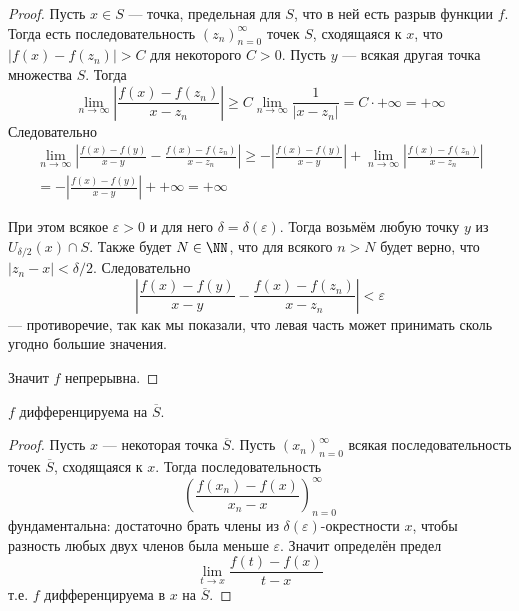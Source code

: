 \documentclass[12pt,a4paper]{article}
\begin{document}
\begin{enumproblem}
        \begin{proof}
            Пусть $x \in S$ --- точка, предельная для $S$, что в ней есть разрыв функции $f$. Тогда есть последовательность $(z_n)_{n=0}^\infty$ точек $S$, сходящаяся к $x$, что $|f(x) - f(z_n)| > C$ для некоторого $C > 0$. Пусть $y$ --- всякая другая точка множества $S$. Тогда
            \[
                \lim_{n \to \infty} \left|\frac{f(x)-f(z_n)}{x-z_n}\right|
                \geqslant C \lim_{n \to \infty} \frac{1}{|x-z_n|}
                = C \cdot +\infty
                = +\infty
            \]
            Следовательно
            \begin{multline*}
                \lim_{n \to \infty} \left|\frac{f(x)-f(y)}{x-y} - \frac{f(x)-f(z_n)}{x-z_n}\right|
                \geqslant -\left|\frac{f(x)-f(y)}{x-y}\right| + \lim_{n \to \infty} \left|\frac{f(x)-f(z_n)}{x-z_n}\right|\\
                = -\left|\frac{f(x)-f(y)}{x-y}\right| + {+\infty}
                = +\infty
            \end{multline*}

            При этом всякое $\varepsilon > 0$ и для него $\delta = \delta(\varepsilon)$. Тогда возьмём любую точку $y$ из $U_{\delta/2}(x) \cap S$. Также будет $N \in \NN$, что для всякого $n > N$ будет верно, что $|z_n - x| < \delta/2$. Следовательно
            \[\left|\frac{f(x)-f(y)}{x-y} - \frac{f(x)-f(z_n)}{x-z_n}\right| < \varepsilon\]
            --- противоречие, так как мы показали, что левая часть может принимать сколь угодно большие значения.
            
            Значит $f$ непрерывна.
        \end{proof}

        \begin{lemma}
            $f$ дифференцируема на $\overline{S}$.
        \end{lemma}

        \begin{proof}
            Пусть $x$ --- некоторая точка $\overline{S}$. Пусть $(x_n)_{n=0}^\infty$ всякая последовательность точек $\overline{S}$, сходящаяся к $x$. Тогда последовательность
            \[\left(\frac{f(x_n) - f(x)}{x_n - x}\right)_{n=0}^\infty\]
            фундаментальна: достаточно брать члены из $\delta(\varepsilon)$-окрестности $x$, чтобы разность любых двух членов была меньше $\varepsilon$. Значит определён предел
            \[
                \lim_{t \to x} \frac{f(t) - f(x)}{t - x}
            \]
            т.е. $f$ дифференцируема в $x$ на $\overline{S}$.
        \end{proof}


\end{enumproblem}
\end{document}
